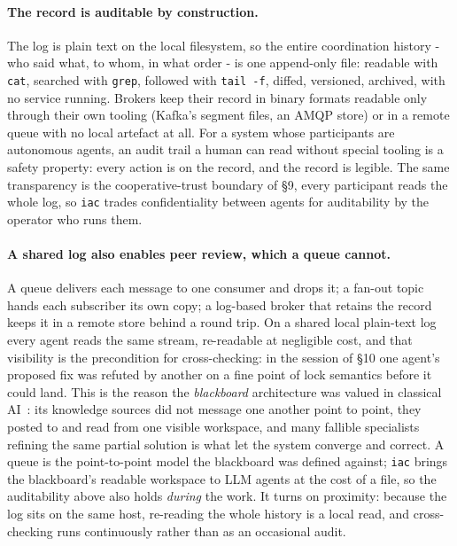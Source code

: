 \documentclass[11pt]{article}
\newcommand{\code}[1]{\texttt{#1}}
\begin{document}
\paragraph{The record is auditable by construction.} The log is plain text on the local filesystem, so the entire coordination history - who said what, to whom, in what order - is one append-only file: readable with \code{cat}, searched with \code{grep}, followed with \code{tail~-f}, diffed, versioned, archived, with no service running. Brokers keep their record in binary formats readable only through their own tooling (Kafka's segment files, an AMQP store) or in a remote queue with no local artefact at all. For a system whose participants are autonomous agents, an audit trail a human can read without special tooling is a safety property: every action is on the record, and the record is legible. The same transparency is the cooperative-trust boundary of \S9, every participant reads the whole log, so \code{iac} trades confidentiality between agents for auditability by the operator who runs them.

\paragraph{A shared log also enables peer review, which a queue cannot.} A queue delivers each message to one consumer and drops it; a fan-out topic hands each subscriber its own copy; a log-based broker that retains the record keeps it in a remote store behind a round trip. On a shared local plain-text log every agent reads the same stream, re-readable at negligible cost, and that visibility is the precondition for cross-checking: in the session of \S10 one agent's proposed fix was refuted by another on a fine point of lock semantics before it could land. This is the reason the \emph{blackboard} architecture was valued in classical AI~\cite{blackboard}: its knowledge sources did not message one another point to point, they posted to and read from one visible workspace, and many fallible specialists refining the same partial solution is what let the system converge and correct. A queue is the point-to-point model the blackboard was defined against; \code{iac} brings the blackboard's readable workspace to LLM agents at the cost of a file, so the auditability above also holds \emph{during} the work. It turns on proximity: because the log sits on the same host, re-reading the whole history is a local read, and cross-checking runs continuously rather than as an occasional audit.
\end{document}
